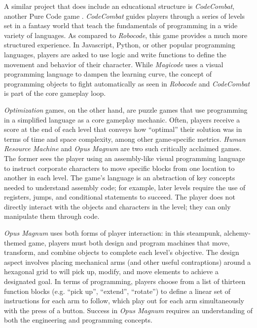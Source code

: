 \documentclass[10pt,twocolumn]{article}
\begin{document}
A similar project that does include an educational structure is \textit{CodeCombat}, another Pure Code game \cite{code-combat}. \textit{CodeCombat} guides players through a series of levels set in a fantasy world that teach the fundamentals of programming in a wide variety of languages. As compared to \textit{Robocode}, this game provides a much more structured experience. In Javascript, Python, or other popular programming languages, players are asked to use logic and write functions to define the movement and behavior of their character. While \textit{Magicode} uses a visual programming language to dampen the learning curve, the concept of programming objects to fight automatically as seen in \textit{Robocode} and \textit{CodeCombat} is part of the core gameplay loop.

\textit{Optimization} games, on the other hand, are puzzle games that use programming in a simplified language as a core gameplay mechanic. Often, players receive a score at the end of each level that conveys how “optimal” their solution was in terms of time and space complexity, among other game-specific metrics. \textit{Human Resource Machine} \cite{human-resource-machine-steam} and \textit{Opus Magnum} \cite{opus-magnum-steam} are two such critically acclaimed games. The former sees the player using an assembly-like visual programming language to instruct corporate characters to move specific blocks from one location to another in each level. The game’s language is an abstraction of key concepts needed to understand assembly code; for example, later levels require the use of registers, jumps, and conditional statements to succeed. The player does not directly interact with the objects and characters in the level; they can only manipulate them through code.

\textit{Opus Magnum} uses both forms of player interaction: in this steampunk, alchemy-themed game, players must both design and program machines that move, transform, and combine objects to complete each level’s objective. The design aspect involves placing mechanical arms (and other useful contraptions) around a hexagonal grid to will pick up, modify, and move elements to achieve a designated goal. In terms of programming, players choose from a list of thirteen function blocks (e.g. “pick up”, “extend”, “rotate”) to define a linear set of instructions for each arm to follow, which play out for each arm simultaneously with the press of a button. Success in \textit{Opus Magnum} requires an understanding of both the engineering and programming concepts.
\end{document}
